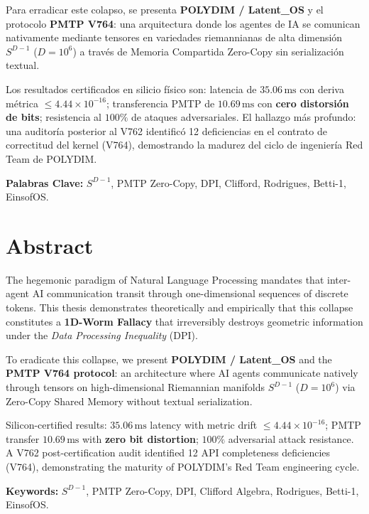 \documentclass[12pt, a4paper, twoside]{report}
\theoremstyle{definition}
\theoremstyle{remark}
\begin{document}
Para erradicar este colapso, se presenta \textbf{POLYDIM / Latent\_OS} y el protocolo
\textbf{PMTP V764}: una arquitectura donde los agentes de IA se comunican nativamente
mediante tensores en variedades riemannianas de alta dimensión $S^{D-1}$ ($D = 10^6$)
a través de Memoria Compartida Zero-Copy sin serialización textual.

Los resultados certificados en silicio físico son: latencia de $35.06\,\text{ms}$
con deriva métrica $\le 4.44 \times 10^{-16}$; transferencia PMTP de $10.69\,\text{ms}$
con \textbf{cero distorsión de bits}; resistencia al $100\%$ de ataques adversariales.
El hallazgo más profundo: una auditoría posterior al V762 identificó 12 deficiencias
en el contrato de correctitud del kernel (V764), demostrando la madurez del ciclo
de ingeniería Red Team de POLYDIM.

\textbf{Palabras Clave:} $S^{D-1}$, PMTP Zero-Copy, DPI, Clifford, Rodrigues, Betti-1, EinsofOS.

\chapter*{Abstract}

The hegemonic paradigm of Natural Language Processing mandates that inter-agent AI
communication transit through one-dimensional sequences of discrete tokens. This thesis
demonstrates theoretically and empirically that this collapse constitutes a \textbf{1D-Worm
Fallacy} that irreversibly destroys geometric information under the \textit{Data Processing
Inequality} (DPI).

To eradicate this collapse, we present \textbf{POLYDIM / Latent\_OS} and the \textbf{PMTP V764
protocol}: an architecture where AI agents communicate natively through tensors on
high-dimensional Riemannian manifolds $S^{D-1}$ ($D = 10^6$) via Zero-Copy Shared
Memory without textual serialization.

Silicon-certified results: $35.06\,\text{ms}$ latency with metric drift $\le 4.44 \times 10^{-16}$;
PMTP transfer $10.69\,\text{ms}$ with \textbf{zero bit distortion}; $100\%$ adversarial
attack resistance. A V762 post-certification audit identified 12 API completeness
deficiencies (V764), demonstrating the maturity of POLYDIM's Red Team engineering cycle.

\textbf{Keywords:} $S^{D-1}$, PMTP Zero-Copy, DPI, Clifford Algebra, Rodrigues, Betti-1, EinsofOS.

\tableofcontents
\listoftables
\listoffigures
\lstlistoflistings
\end{document}
